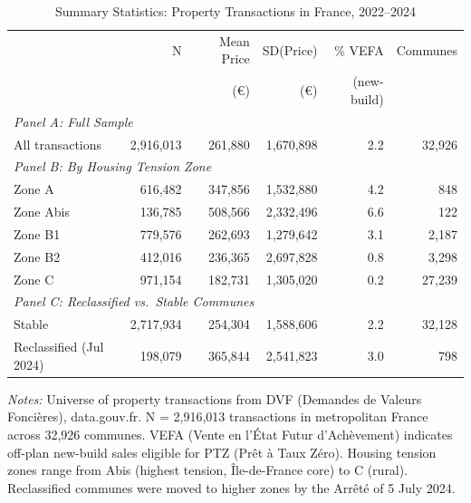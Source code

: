 \begin{table}[H]
\centering
\caption{Summary Statistics: Property Transactions in France, 2022--2024}
\label{tab:summary}
\begin{threeparttable}
\begin{tabular}{lrrrrr}
\toprule
 & N & Mean Price & SD(Price) & \% VEFA & Communes \\
 & & (\euro) & (\euro) & (new-build) & \\
\midrule
\multicolumn{6}{l}{\textit{Panel A: Full Sample}} \\[3pt]
All transactions & 2,916,013 & 261,880 & 1,670,898 & 2.2 & 32,926 \\
\midrule
\multicolumn{6}{l}{\textit{Panel B: By Housing Tension Zone}} \\[3pt]
Zone A & 616,482 & 347,856 & 1,532,880 & 4.2 & 848 \\
Zone Abis & 136,785 & 508,566 & 2,332,496 & 6.6 & 122 \\
Zone B1 & 779,576 & 262,693 & 1,279,642 & 3.1 & 2,187 \\
Zone B2 & 412,016 & 236,365 & 2,697,828 & 0.8 & 3,298 \\
Zone C & 971,154 & 182,731 & 1,305,020 & 0.2 & 27,239 \\
\midrule
\multicolumn{6}{l}{\textit{Panel C: Reclassified vs.\ Stable Communes}} \\[3pt]
Stable & 2,717,934 & 254,304 & 1,588,606 & 2.2 & 32,128 \\
Reclassified (Jul 2024) & 198,079 & 365,844 & 2,541,823 & 3.0 & 798 \\
\bottomrule
\end{tabular}
\begin{tablenotes}[flushleft]
\small
\item \textit{Notes:} Universe of property transactions from DVF (Demandes de Valeurs Fonci\`eres), data.gouv.fr. N = 2,916,013 transactions in metropolitan France across 32,926 communes. VEFA (Vente en l'\'{E}tat Futur d'Ach\`evement) indicates off-plan new-build sales eligible for PTZ (Pr\^et \`a Taux Z\'{e}ro). Housing tension zones range from Abis (highest tension, \^Ile-de-France core) to C (rural). Reclassified communes were moved to higher zones by the Arr\^et\'{e} of 5 July 2024.
\end{tablenotes}
\end{threeparttable}
\end{table}
